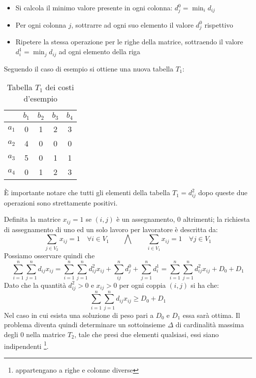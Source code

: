 \documentclass[../template]{subfiles}
\begin{document}
\begin{itemize}
    \item Si calcola il minimo valore presente in ogni colonna: $d^0_j = \min_i d_{ij}$
    \item Per ogni colonna $j$, sottrarre ad ogni suo elemento il valore $d^0_j$ rispettivo
    \item Ripetere la stessa operazione per le righe della matrice, sottraendo il valore $d^1_i = \min_j d_{ij}$ ad ogni
        elemento della riga
\end{itemize}
Seguendo il caso di esempio si ottiene una nuova tabella $T_1$:

\begin{table}[h]
    \centering
    \begin{tabular}{|c|cccc|}
        \hline
    & $b_1$ & $b_2$ & $b_3$ & $b_4$\\
    \hline
        $a_1$ & 0 & 1 & 2 & 3\\
        $a_2$ & 4 & 0 & 0 & 0\\
        $a_3$ & 5 & 0 & 1 & 1\\
        $a_4$ & 0 & 1 & 2 & 3\\
        \hline
    \end{tabular}
    \caption{Tabella $T_1$ dei costi d'esempio}
    \label{tab:hungarian_example_t1}
\end{table}


È importante notare che tutti gli elementi della tabella $T_1 = d_{ij}^2$ dopo queste due operazioni sono strettamente positivi.

Definita la matrice $x_{ij} = 1$ se $(i, j)$ è un assegnamento, 0 altrimenti; la richiesta di assegnamento di uno ed un
solo lavoro per lavoratore è descritta da:
\[
    \sum_{j \in V_2} x_{ij} = 1 \quad \forall i \in V_1 \qquad
    \bigwedge\qquad
    \sum_{i \in V_1} x_{ij} = 1 \quad \forall j \in V_1
\]
Possiamo osservare quindi che
\[
    \sum^n_{i = 1} \sum^n_{j=1} d_{ij} x_{ij} = \sum^n_{i=1}\sum^n_{j=1} d_{ij}^2 x_{ij} + \sum_{ij}^n d_j^0 +
    \sum^n_{j=1} d_i^1 = \sum^n_{i=1}\sum^n_{j=1} d_{ij}^2 x_{ij} + D_0 + D_1
\]
Dato che la quantità $d_{ij}^2 > 0$ e $x_{ij} > 0$ per ogni coppia $(i, j)$ si ha che:
\[
    \sum^n_{i=1}\sum^n_{j=1} d_{ij} x_{ij}  \ge D_0 + D_1
\]
Nel caso in cui esista una soluzione di peso pari a $D_0$ e $D_1$ essa sarà ottima.
Il problema diventa quindi determinare un sottoinsieme $\Delta$ di cardinalità massima degli 0 nella matrice $T_2$, tale
che presi due elementi qualsiasi, essi siano indipendenti \footnote{appartengano a righe e colonne diverse}.
\end{document}
